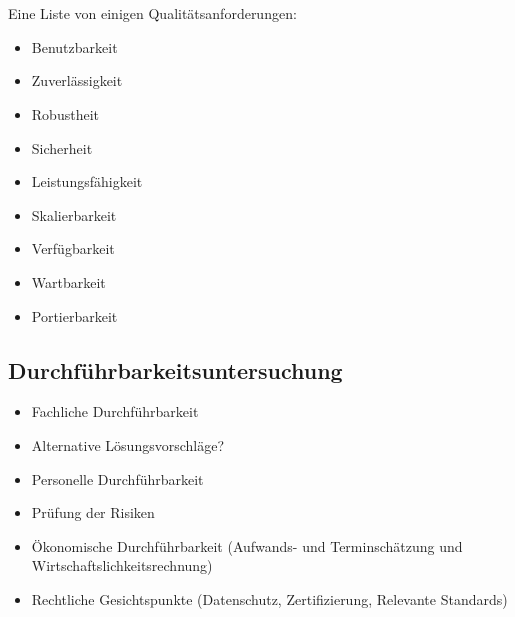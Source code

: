 
\\
\\
Eine Liste von einigen Qualitätsanforderungen:
\begin{itemize}
    \item Benutzbarkeit
    \item Zuverlässigkeit
    \item Robustheit
    \item Sicherheit
    \item Leistungsfähigkeit
    \item Skalierbarkeit
    \item Verfügbarkeit
    \item Wartbarkeit
    \item Portierbarkeit
\end{itemize}



\subsection{Durchführbarkeitsuntersuchung}
\begin{itemize}
    \item Fachliche Durchführbarkeit
    \item Alternative Lösungsvorschläge?
    \item Personelle Durchführbarkeit
    \item Prüfung der Risiken
    \item Ökonomische Durchführbarkeit (Aufwands- und Terminschätzung und Wirtschaftslichkeitsrechnung)
    \item Rechtliche Gesichtspunkte (Datenschutz, Zertifizierung, Relevante Standards)
\end{itemize}
